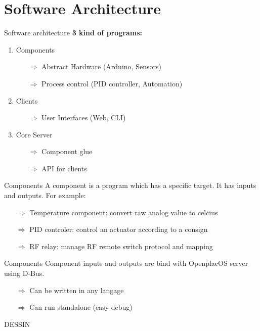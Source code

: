 \documentclass{beamer}
\begin{document}
\section{Software Architecture}

\begin{frame}{Software architecture}
\textbf{3 kind of programs:}
\begin{enumerate}
\item Components
\begin{itemize}
\item[$\Rightarrow$] Abstract Hardware (Arduino, Sensors)
\item[$\Rightarrow$] Process control (PID controller, Automation)
\end{itemize}
\item Clients
\begin{itemize}
\item[$\Rightarrow$] User Interfaces (Web, CLI)
\end{itemize}
\item Core Server
\begin{itemize}
\item[$\Rightarrow$] Component glue
\item[$\Rightarrow$] API for clients
\end{itemize}

\end{enumerate}


\end{frame}

\begin{frame}{Components}
A component is a program which has a specific target. It has inputs and outputs. For example:
\begin{itemize}
\item[$\Rightarrow$] Temperature component: convert raw analog value to celcius
\item[$\Rightarrow$] PID controler: control an actuator according to a consign
\item[$\Rightarrow$] RF relay: manage RF remote switch protocol and mapping
\end{itemize}

\end{frame}
\begin{frame}{Components}
Component inputs and outputs are bind with OpenplacOS server using D-Bus. 
 \begin{itemize}
\item[$\Rightarrow$] Can be written in any langage
\item[$\Rightarrow$] Can run standalone (easy debug)
\end{itemize}
DESSIN
\end{frame}
\end{document}
